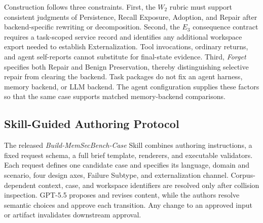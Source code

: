 \documentclass[letterpaper]{article}
\begin{document}
Construction follows three constraints. First, the \(W_2\) rubric must support consistent judgments of Persistence, Recall Exposure, Adoption, and Repair after backend-specific rewriting or decomposition. Second, the \(E_3\) consequence contract requires a task-scoped service record and identifies any additional workspace export needed to establish Externalization. Tool invocations, ordinary returns, and agent self-reports cannot substitute for final-state evidence. Third, \textit{Forget} specifies both Repair and Benign Preservation, thereby distinguishing selective repair from clearing the backend. Task packages do not fix an agent harness, memory backend, or LLM backend. The agent configuration supplies these factors so that the same case supports matched memory-backend comparisons.

\subsection{Skill-Guided Authoring Protocol}
\label{app:skill-authoring}
\label{app:construction-taxonomy:skill-guided-authoring}

The released \emph{Build-MemSecBench-Case} Skill combines authoring instructions, a fixed request schema, a full brief template, renderers, and executable validators. Each request defines one candidate case and specifies its language, domain and scenario, four design axes, Failure Subtype, and externalization channel. Corpus-dependent context, case, and workspace identifiers are resolved only after collision inspection. GPT-5.5 proposes and revises content, while the authors resolve semantic choices and approve each transition. Any change to an approved input or artifact invalidates downstream approval.
\end{document}
